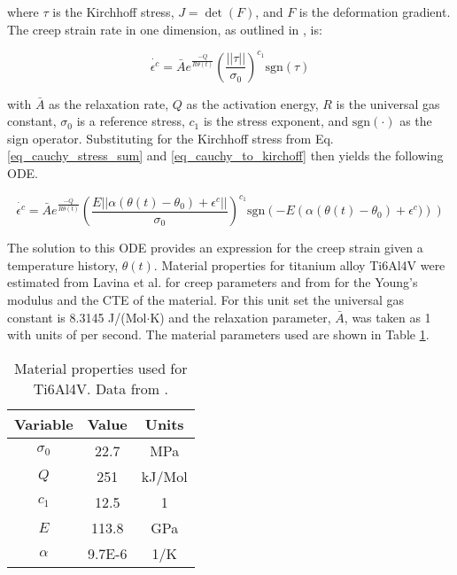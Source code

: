 \documentclass[conf]{new-aiaa}
\begin{document}
\noindent
where $\tau$ is the Kirchhoff stress,
$J=\det(F)$,
and $F$ is the deformation gradient.
The creep strain rate in one dimension, as outlined in 
\cite{ li_simulation_of_finite_strain_inelastic_phenomena_governed_by_creep_and_plasticity},
is:

\begin{equation}
\dot{\epsilon^c} = \bar{A} e^{\frac{-Q}{R \theta(t)}} \left( \frac{ ||\tau||}{\sigma_0} \right)^{c_1} \text{sgn}(\tau)
\end{equation}

\noindent
with $\bar{A}$ as the relaxation rate,
$Q$ as the activation energy,
$R$ is the universal gas constant,
$\sigma_0$ is a reference stress,
$c_1$ is the stress exponent,
and
$\text{sgn}(\cdot)$ as the sign operator.
Substituting for the Kirchhoff stress from Eq. \ref{eq_cauchy_stress_sum} and \ref{eq_cauchy_to_kirchoff}
then yields the following ODE.

\begin{equation} \label{eq_creep_ode}
\dot{\epsilon^c} = \bar{A} e^{\frac{-Q}{R \theta(t)}} 
    \left( \frac{E || \alpha (\theta(t) - \theta_0) + \epsilon^c||}{\sigma_0} \right)^{c_1} 
    \text{sgn}\left( -E \left( \alpha (\theta(t) - \theta_0) + \epsilon^c) \right) \right)
\end{equation}

The solution to this ODE provides an expression for the creep strain
given a temperature history, $\theta(t)$.
Material properties for titanium alloy Ti6Al4V were estimated from
Lavina et al. \cite{ lavina_creep_behavior_of_Ti6Al4V_from_450C_to_600C}
for creep parameters and from \cite{
boyer_materials_properties_handbook_titanium_alloys}
for the Young's modulus and the CTE of the material.
For this unit set the universal gas constant is 8.3145 J/(Mol$\cdot$K)
and the relaxation parameter, $\bar{A}$, was taken as 1 with units of per second.
The material parameters used are shown in Table \ref{tab_material_properties}.

\begin{table}[H]
  \centering
  \caption{
    Material properties used for Ti6Al4V.
    Data from 
    \cite{ lavina_creep_behavior_of_Ti6Al4V_from_450C_to_600C,
      boyer_materials_properties_handbook_titanium_alloys}.}
  \begin{tabular}{|c|c|c|}
    \hline
    Variable & Value & Units  \\
    \hline
    $\sigma_0$ & 22.7  & MPa    \\
    $Q$      & 251     & kJ/Mol \\
    $c_1$    & 12.5    & 1      \\
    $E$      & 113.8   & GPa    \\
    $\alpha$ & 9.7E-6  & 1/K    \\
    \hline
  \end{tabular}
  \label{tab_material_properties}
\end{table}
\end{document}
